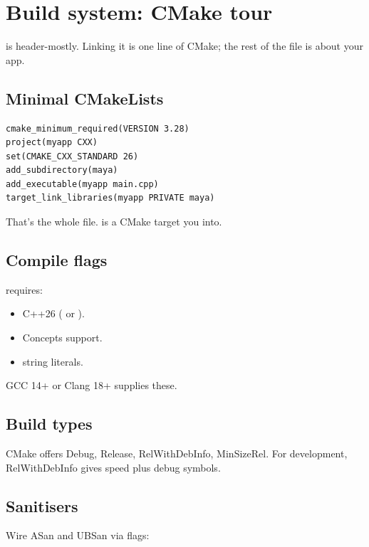 \chapter{Build system: CMake tour}
\label{ch:cmake}

\begin{aside}
\maya{} is header-mostly. Linking it is one line of CMake; the
rest of the file is about your app.
\end{aside}

\section{Minimal CMakeLists}

\begin{lstlisting}
cmake_minimum_required(VERSION 3.28)
project(myapp CXX)
set(CMAKE_CXX_STANDARD 26)
add_subdirectory(maya)
add_executable(myapp main.cpp)
target_link_libraries(myapp PRIVATE maya)
\end{lstlisting}

That's the whole file. \maya{} is a CMake target you
 into.

\section{Compile flags}

\maya{} requires:

\begin{itemize}[leftmargin=*]
  \item C++26 ( or ).
  \item Concepts support.
  \item {} string literals.
\end{itemize}

GCC 14+ or Clang 18+ supplies these.

\section{Build types}

CMake offers Debug, Release, RelWithDebInfo, MinSizeRel.
For development, RelWithDebInfo gives speed plus debug
symbols.

\section{Sanitisers}

Wire ASan and UBSan via flags:

